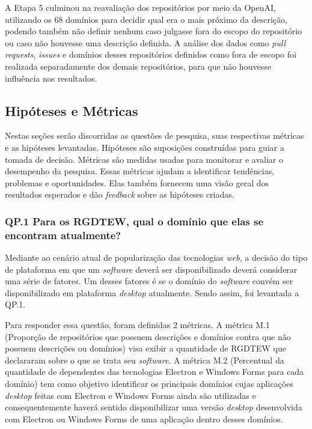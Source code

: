 \documentclass[12pt]{article}
\begin{document}
A Etapa 5 culminou na reavaliação dos repositórios por meio da OpenAI, utilizando os 68 domínios para decidir qual era o mais próximo da descrição, podendo também não definir nenhum caso julgasse fora do escopo do repositório ou caso não houvesse uma descrição definida. A análise dos dados como \textit{pull requests}, \textit{issues} e domínios desses repositórios definidos como fora de escopo foi realizada separadamente dos demais repositórios, para que não houvesse influência nos resultados.

\subsection{Hipóteses e Métricas}

Nestas seções serão discorridas as questões de pesquisa, suas respectivas métricas e as hipóteses levantadas. Hipóteses são suposições construídas para guiar a tomada de decisão. Métricas são medidas usadas para monitorar e avaliar o desempenho da pesquisa. Essas métricas ajudam a identificar tendências, problemas e oportunidades. Elas também fornecem uma visão geral dos resultados esperados e dão \textit{feedback} sobre as hipóteses criadas.

\subsubsection{QP.1 Para os RGDTEW, qual o domínio que elas se encontram atualmente?}

Mediante ao cenário atual de popularização das tecnologias \textit{web}, a decisão do tipo de plataforma em que um \textit{software} deverá ser disponibilizado  deverá considerar uma série de fatores. Um desses fatores é se o domínio do \textit{software} convém ser disponibilizado em plataforma \textit{desktop} atualmente. Sendo assim, foi levantada a QP.1.

Para responder essa questão, foram definidas 2 métricas. A métrica M.1 (Proporção de repositórios que possuem descrições e domínios contra que não possuem descrições ou domínios) visa exibir a quantidade de RGDTEW que declararam sobre o que se trata seu \textit{software}. A métrica M.2 (Percentual da quantidade de dependentes das tecnologias Electron e Windows Forms para cada domínio) tem como objetivo identificar os principais domínios cujas aplicações \textit{desktop} feitas com Electron e Windows Forms ainda são utilizadas e consequentemente haverá sentido disponibilizar uma versão \textit{desktop} desenvolvida com Electron ou Windows Forms de uma aplicação dentro desses domínios. 
\end{document}
